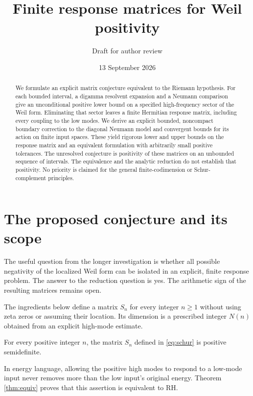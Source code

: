 
\title{Finite response matrices for Weil positivity}
\author{Draft for author review}
\date{13 September 2026}
\maketitle
\begin{abstract}
We formulate an explicit matrix conjecture equivalent to the Riemann hypothesis.
For each bounded interval, a digamma resolvent expansion and a Neumann comparison
give an unconditional positive lower bound on a specified high-frequency sector
of the Weil form. Eliminating that sector leaves a finite Hermitian response
matrix, including every coupling to the low modes. We derive an explicit bounded,
noncompact boundary correction to the diagonal Neumann model and convergent
bounds for its action on finite input spaces. These yield rigorous lower and
upper bounds on the response matrix and an equivalent formulation with arbitrarily
small positive tolerances. The unresolved conjecture is positivity of these
matrices on an unbounded sequence of intervals. The equivalence and the analytic
reduction do not establish that positivity. No priority is claimed for the
general finite-codimension or Schur-complement principles.
\end{abstract}

\section{The proposed conjecture and its scope}
The useful question from the longer investigation \cite{Investigation} is whether
all possible negativity of the localized Weil form can be isolated in an
explicit, finite response problem. The answer to the reduction question is yes.
The arithmetic sign of the resulting matrices remains open.

The ingredients below define a matrix $S_n$ for every integer $n\ge1$ without
using zeta zeros or assuming their location. Its dimension is a prescribed
integer $N(n)$ obtained from an explicit high-mode estimate.
\begin{conjecture}\label{conj:main}
For every positive integer $n$, the matrix $S_n$ defined in
\eqref{eq:schur} is positive semidefinite.
\end{conjecture}
In energy language, allowing the positive high modes to respond to a low-mode
input never removes more than the low input's original energy. Theorem
\ref{thm:equiv} proves that this assertion is equivalent to RH.

